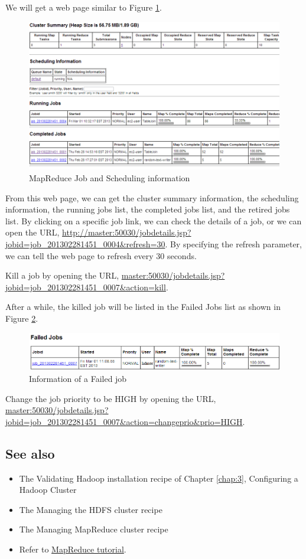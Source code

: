 We will get a web page similar to Figure \ref{fig:mapred.status}.
\begin{figure}[ht]
  \centering
  \includegraphics[width=\textwidth]{figs/5163os_04_11.png}
  \caption{MapReduce Job and Scheduling information}\label{fig:mapred.status}
\end{figure} 
From this web page, we can get the cluster summary information, the scheduling information, the running jobs list, the completed jobs list, and the retired jobs list. By clicking on a specific job link, we can check the details of a job, or we can open the URL, \url{http://master:50030/jobdetails.jsp?jobid=job_201302281451_0004&refresh=30}. By specifying the refresh parameter, we can tell the web page to refresh every 30 seconds.

Kill a job by opening the URL, \url{master:50030/jobdetails.jsp?jobid=job_201302281451_0007&action=kill}.

After a while, the killed job will be listed in the Failed Jobs list as shown in Figure \ref{fig:failed.job}.
\begin{figure}[ht]
  \centering
  \includegraphics[width=\textwidth]{figs/5163os_04_12.png}
  \caption{Information of a Failed job}\label{fig:failed.job}
\end{figure} 

Change the job priority to be HIGH by opening the URL, \url{master:50030/jobdetails.jsp?jobid=job_201302281451_0007&action=changeprio&prio=HIGH}. \\
\subsection*{See also}
\begin{itemize}
  \item The Validating Hadoop installation recipe of Chapter \ref{chap:3}, Configuring a Hadoop Cluster
  \item The Managing the HDFS cluster recipe
  \item The Managing MapReduce cluster recipe
  \item Refer to \href{http://hadoop.apache.org/docs/r1.1.2/mapred_tutorial.html}{MapReduce tutorial}.
\end{itemize}

